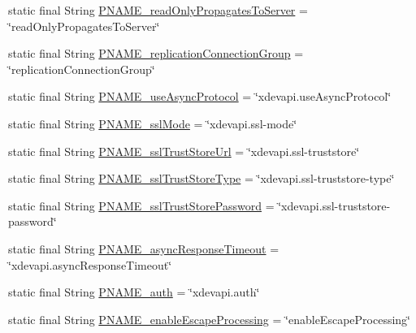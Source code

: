 \begin{DoxyCompactItemize}
\item 
static final String \mbox{\hyperlink{classcom_1_1mysql_1_1cj_1_1conf_1_1_property_definitions_a8bc41630c309e11509ac840f4c4d5ad7}{P\+N\+A\+M\+E\+\_\+read\+Only\+Propagates\+To\+Server}} = \char`\"{}read\+Only\+Propagates\+To\+Server\char`\"{}
\item 
static final String \mbox{\hyperlink{classcom_1_1mysql_1_1cj_1_1conf_1_1_property_definitions_ab02b1a6902ac145dc02775537dc19093}{P\+N\+A\+M\+E\+\_\+replication\+Connection\+Group}} = \char`\"{}replication\+Connection\+Group\char`\"{}
\item 
static final String \mbox{\hyperlink{classcom_1_1mysql_1_1cj_1_1conf_1_1_property_definitions_aba68ba0b6d46996e85f18c5ad414c0d7}{P\+N\+A\+M\+E\+\_\+use\+Async\+Protocol}} = \char`\"{}xdevapi.\+use\+Async\+Protocol\char`\"{}
\item 
static final String \mbox{\hyperlink{classcom_1_1mysql_1_1cj_1_1conf_1_1_property_definitions_aed84e1e8232687f1f9cf2c1e629e99c5}{P\+N\+A\+M\+E\+\_\+ssl\+Mode}} = \char`\"{}xdevapi.\+ssl-\/mode\char`\"{}
\item 
static final String \mbox{\hyperlink{classcom_1_1mysql_1_1cj_1_1conf_1_1_property_definitions_ac01368426939594c20d25edfdf2b6f91}{P\+N\+A\+M\+E\+\_\+ssl\+Trust\+Store\+Url}} = \char`\"{}xdevapi.\+ssl-\/truststore\char`\"{}
\item 
static final String \mbox{\hyperlink{classcom_1_1mysql_1_1cj_1_1conf_1_1_property_definitions_a1d4510674aaec9a522a0d45b6579f73d}{P\+N\+A\+M\+E\+\_\+ssl\+Trust\+Store\+Type}} = \char`\"{}xdevapi.\+ssl-\/truststore-\/type\char`\"{}
\item 
static final String \mbox{\hyperlink{classcom_1_1mysql_1_1cj_1_1conf_1_1_property_definitions_a87623840b4eec648043fe571b884400e}{P\+N\+A\+M\+E\+\_\+ssl\+Trust\+Store\+Password}} = \char`\"{}xdevapi.\+ssl-\/truststore-\/password\char`\"{}
\item 
static final String \mbox{\hyperlink{classcom_1_1mysql_1_1cj_1_1conf_1_1_property_definitions_abcca298bb61529133c71710af0003312}{P\+N\+A\+M\+E\+\_\+async\+Response\+Timeout}} = \char`\"{}xdevapi.\+async\+Response\+Timeout\char`\"{}
\item 
static final String \mbox{\hyperlink{classcom_1_1mysql_1_1cj_1_1conf_1_1_property_definitions_a83d450000d4a5e1f09170bba7f42a947}{P\+N\+A\+M\+E\+\_\+auth}} = \char`\"{}xdevapi.\+auth\char`\"{}
\item 
static final String \mbox{\hyperlink{classcom_1_1mysql_1_1cj_1_1conf_1_1_property_definitions_a361775e4e4329fdfd54237feea4ea992}{P\+N\+A\+M\+E\+\_\+enable\+Escape\+Processing}} = \char`\"{}enable\+Escape\+Processing\char`\"{}

\end{DoxyCompactItemize}
